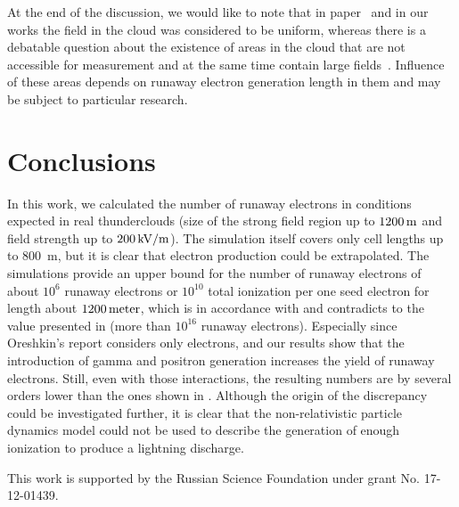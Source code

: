 \documentclass[doublecol,linenumbers]{epl2} %
\begin{document}
	At the end of the discussion, we would like to note that in paper~\cite{Oreshkin_2018} and in our works the field in the cloud was considered to be uniform, whereas there is a debatable question about the existence of areas in the cloud that are not accessible for measurement and at the same time contain large fields~\cite{dwyer2003fundamental}. Influence of these areas depends on runaway electron generation length in them and may be subject to particular research.
	
	\section{Conclusions}
	
	In this work, we calculated the number of runaway electrons in conditions expected in real thunderclouds (size of the strong field region up to $1200\un{m}$ and field strength up to $200\un{kV/m}$). The simulation itself covers only cell lengths up to 800~m, but it is clear that electron production could be extrapolated. The simulations provide an upper bound for the number of runaway electrons of about $10^6$ runaway electrons or $10^{10}$ total ionization per one seed electron for length about $1200\un{meter}$, which is in accordance with \cite{Gurevich:2001, Dwyer2013_radio} and contradicts to the value presented in \cite{Oreshkin_2018} (more than $10^{16}$ runaway electrons). Especially since Oreshkin’s report considers only electrons, and our results show that the introduction of gamma and positron generation increases the yield of runaway electrons.
	Still, even with those interactions, the resulting numbers are by several orders lower than the ones shown in \cite{Oreshkin_2018}. Although the origin of the discrepancy could be investigated further, it is clear that the non-relativistic particle dynamics model could not be used to describe the generation of enough ionization to produce a lightning discharge.
	
	\acknowledgments
	This work is supported by the Russian Science Foundation under grant No. 17-12-01439.
	
	
	
\end{document}
